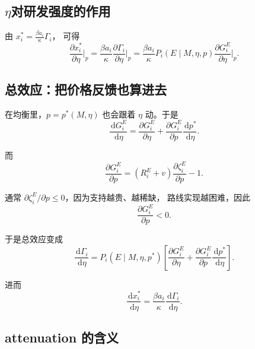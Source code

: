 \documentclass[12pt,UTF8]{ctexart}
\newcommand{\dd}{\,\mathrm{d}}
\theoremstyle{plain}
\theoremstyle{remark}
\begin{document}
\subsection{\texorpdfstring{$\eta$}{实施强度}对研发强度的作用}

由
$x_i^*=\frac{\beta a_i}{\kappa}\Gamma_i$，
可得
\begin{equation}
\frac{\partial x_i^*}{\partial \eta}\Big|_{p}
=
\frac{\beta a_i}{\kappa}
\frac{\partial \Gamma_i}{\partial \eta}\Big|_{p}
=
\frac{\beta a_i}{\kappa}
P_i(E\mid M,\eta,p)
\frac{\partial G_i^E}{\partial \eta}\Big|_{p}.
\label{eq:dx_deta_partial}
\end{equation}

\subsection{总效应：把价格反馈也算进去}

在均衡里，$p=p^*(M,\eta)$ 也会跟着 $\eta$ 动。于是
\begin{equation}
\frac{\dd G_i^E}{\dd \eta}
=
\frac{\partial G_i^E}{\partial \eta}
+
\frac{\partial G_i^E}{\partial p}
\frac{\dd p^*}{\dd \eta}.
\label{eq:total_GE_eta}
\end{equation}

而
\begin{equation}
\frac{\partial G_i^E}{\partial p}
=
(R_i^E+v)\frac{\partial \zeta_i^E}{\partial p} -1.
\label{eq:dGE_dp}
\end{equation}

通常 $\partial \zeta_i^E/\partial p\le 0$，因为支持越贵、越稀缺，
路线实现越困难，因此
\[
\frac{\partial G_i^E}{\partial p}<0.
\]

于是总效应变成
\begin{equation}
\frac{\dd \Gamma_i}{\dd \eta}
=
P_i(E\mid M,\eta,p^*)
\left[
\frac{\partial G_i^E}{\partial \eta}
+
\frac{\partial G_i^E}{\partial p}
\frac{\dd p^*}{\dd \eta}
\right].
\label{eq:total_gamma_eta}
\end{equation}

进而
\begin{equation}
\frac{\dd x_i^*}{\dd \eta}
=
\frac{\beta a_i}{\kappa}
\frac{\dd \Gamma_i}{\dd \eta}.
\label{eq:total_x_eta}
\end{equation}

\subsection{attenuation 的含义}
\end{document}
